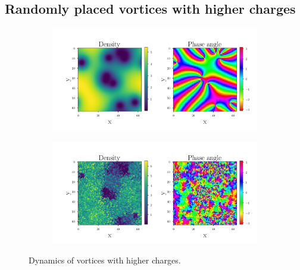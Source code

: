 \subsection{Randomly placed vortices with higher charges}
 \begin{figure}[H]
 \centering
 \begin{subfigure}{0.49\textwidth} 
 	\includegraphics[width= \textwidth]{figures/vortex_2_0}
 \end{subfigure}
 \begin{subfigure}{0.49\textwidth} 
 	\includegraphics[width= \textwidth]{figures/vortex_2_80}
 \end{subfigure}
 \caption{Dynamics of vortices with higher charges.}	
 \end{figure}
 
